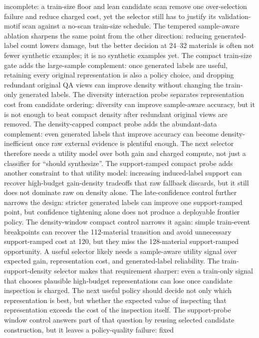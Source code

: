 \documentclass[11pt]{article}
\begin{document}
incomplete: a train-size floor and lean candidate scan remove one over-selection
failure and reduce charged cost, yet the selector still has to justify its
validation-motif scan against a no-scan train-size schedule.
The tempered sample-aware ablation sharpens the same point from the other
direction: reducing generated-label count lowers damage, but the better
decision at 24--32 materials is often not fewer synthetic examples; it is no
synthetic examples yet.
The compact train-size gate adds the large-sample complement: once generated
labels are useful, retaining every original representation is also a policy
choice, and dropping redundant original QA views can improve density without
changing the train-only generated labels.
The diversity interaction probe separates representation cost from candidate
ordering: diversity can improve sample-aware accuracy, but it is not enough to
beat compact density after redundant original views are removed.
The density-capped compact probe adds the abundant-data complement: even
generated labels that improve accuracy can become density-inefficient once raw
external evidence is plentiful enough. The next selector therefore needs a
utility model over both gain and charged compute, not just a classifier for
``should synthesize''.
The support-ramped compact probe adds another constraint to that utility model:
increasing induced-label support can recover high-budget gain-density tradeoffs
that raw fallback discards, but it still does not dominate raw on density
alone.
The late-confidence control further narrows the design: stricter generated
labels can improve one support-ramped point, but confidence tightening alone
does not produce a deployable frontier policy.
The density-window compact control narrows it again: simple train-event
breakpoints can recover the 112-material transition and avoid unnecessary
support-ramped cost at 120, but they miss the 128-material support-ramped
opportunity. A useful selector likely needs a sample-aware utility signal over
expected gain, representation cost, and generated-label reliability.
The train-support-density selector makes that requirement sharper: even a
train-only signal that chooses plausible high-budget representations can lose
once candidate inspection is charged. The next useful policy should decide not
only which representation is best, but whether the expected value of inspecting
that representation exceeds the cost of the inspection itself.
The support-probe window control answers part of that question by reusing
selected candidate construction, but it leaves a policy-quality failure: fixed
\end{document}
